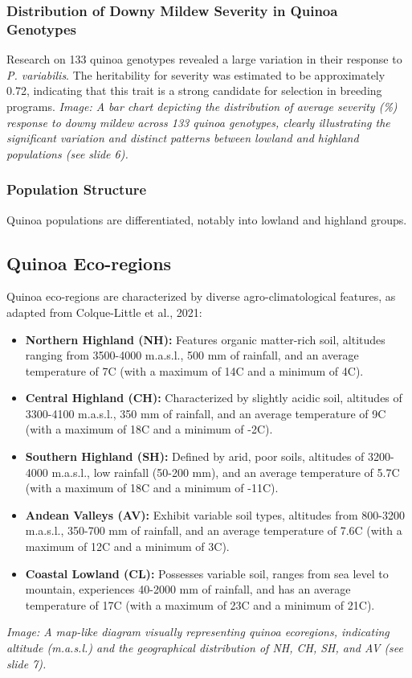\subsubsection{Distribution of Downy Mildew Severity in Quinoa Genotypes} 
Research on 133 quinoa genotypes revealed a large variation in their response to \textit{P. variabilis}. The heritability for severity was estimated to be approximately 0.72, indicating that this trait is a strong candidate for selection in breeding programs. \textit{Image: A bar chart depicting the distribution of average severity (\%) response to downy mildew across 133 quinoa genotypes, clearly illustrating the significant variation and distinct patterns between lowland and highland populations (see slide 6).}

\subsubsection{Population Structure} 
Quinoa populations are differentiated, notably into lowland and highland groups.

\subsection{Quinoa Eco-regions} 
Quinoa eco-regions are characterized by diverse agro-climatological features, as adapted from Colque-Little et al., 2021: 
\begin{itemize} 
    \item \textbf{Northern Highland (NH):} Features organic matter-rich soil, altitudes ranging from 3500-4000 m.a.s.l., 500 mm of rainfall, and an average temperature of 7\textdegree C (with a maximum of 14\textdegree C and a minimum of 4\textdegree C). 
    \item \textbf{Central Highland (CH):} Characterized by slightly acidic soil, altitudes of 3300-4100 m.a.s.l., 350 mm of rainfall, and an average temperature of 9\textdegree C (with a maximum of 18\textdegree C and a minimum of -2\textdegree C). 
    \item \textbf{Southern Highland (SH):} Defined by arid, poor soils, altitudes of 3200-4000 m.a.s.l., low rainfall (50-200 mm), and an average temperature of 5.7\textdegree C (with a maximum of 18\textdegree C and a minimum of -11\textdegree C). 
    \item \textbf{Andean Valleys (AV):} Exhibit variable soil types, altitudes from 800-3200 m.a.s.l., 350-700 mm of rainfall, and an average temperature of 7.6\textdegree C (with a maximum of 12\textdegree C and a minimum of 3\textdegree C). 
    \item \textbf{Coastal Lowland (CL):} Possesses variable soil, ranges from sea level to mountain, experiences 40-2000 mm of rainfall, and has an average temperature of 17\textdegree C (with a maximum of 23\textdegree C and a minimum of 21\textdegree C). 
\end{itemize} 
\textit{Image: A map-like diagram visually representing quinoa ecoregions, indicating altitude (m.a.s.l.) and the geographical distribution of NH, CH, SH, and AV (see slide 7).}

